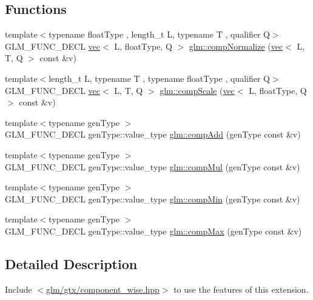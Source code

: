 \subsection*{Functions}
\begin{DoxyCompactItemize}
\item 
{\footnotesize template$<$typename float\+Type , length\+\_\+t L, typename T , qualifier Q$>$ }\\G\+L\+M\+\_\+\+F\+U\+N\+C\+\_\+\+D\+E\+CL \hyperlink{structglm_1_1vec}{vec}$<$ L, float\+Type, Q $>$ \hyperlink{group__gtx__component__wise_ga8f2b81ada8515875e58cb1667b6b9908}{glm\+::comp\+Normalize} (\hyperlink{structglm_1_1vec}{vec}$<$ L, T, Q $>$ const \&v)
\item 
{\footnotesize template$<$length\+\_\+t L, typename T , typename float\+Type , qualifier Q$>$ }\\G\+L\+M\+\_\+\+F\+U\+N\+C\+\_\+\+D\+E\+CL \hyperlink{structglm_1_1vec}{vec}$<$ L, T, Q $>$ \hyperlink{group__gtx__component__wise_ga80abc2980d65d675f435d178c36880eb}{glm\+::comp\+Scale} (\hyperlink{structglm_1_1vec}{vec}$<$ L, float\+Type, Q $>$ const \&v)
\item 
{\footnotesize template$<$typename gen\+Type $>$ }\\G\+L\+M\+\_\+\+F\+U\+N\+C\+\_\+\+D\+E\+CL gen\+Type\+::value\+\_\+type \hyperlink{group__gtx__component__wise_gaf71833350e15e74d31cbf8a3e7f27051}{glm\+::comp\+Add} (gen\+Type const \&v)
\item 
{\footnotesize template$<$typename gen\+Type $>$ }\\G\+L\+M\+\_\+\+F\+U\+N\+C\+\_\+\+D\+E\+CL gen\+Type\+::value\+\_\+type \hyperlink{group__gtx__component__wise_gae8ab88024197202c9479d33bdc5a8a5d}{glm\+::comp\+Mul} (gen\+Type const \&v)
\item 
{\footnotesize template$<$typename gen\+Type $>$ }\\G\+L\+M\+\_\+\+F\+U\+N\+C\+\_\+\+D\+E\+CL gen\+Type\+::value\+\_\+type \hyperlink{group__gtx__component__wise_gab5d0832b5c7bb01b8d7395973bfb1425}{glm\+::comp\+Min} (gen\+Type const \&v)
\item 
{\footnotesize template$<$typename gen\+Type $>$ }\\G\+L\+M\+\_\+\+F\+U\+N\+C\+\_\+\+D\+E\+CL gen\+Type\+::value\+\_\+type \hyperlink{group__gtx__component__wise_gabfa4bb19298c8c73d4217ba759c496b6}{glm\+::comp\+Max} (gen\+Type const \&v)
\end{DoxyCompactItemize}


\subsection{Detailed Description}
Include $<$\hyperlink{component__wise_8hpp}{glm/gtx/component\+\_\+wise.\+hpp}$>$ to use the features of this extension.

